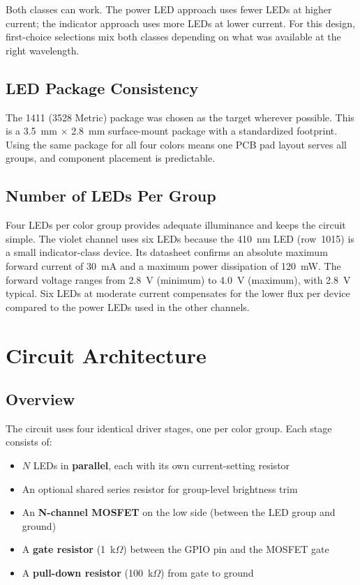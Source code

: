 \documentclass[12pt,letterpaper]{article}
\begin{document}
Both classes can work. The power LED approach uses fewer LEDs at higher current;
the indicator approach uses more LEDs at lower current. For this design, first-choice
selections mix both classes depending on what was available at the right wavelength.

\subsection{LED Package Consistency}

The 1411 (3528 Metric) package was chosen as the target wherever possible. This is a
3.5~mm $\times$ 2.8~mm surface-mount package with a standardized footprint. Using the
same package for all four colors means one PCB pad layout serves all groups, and
component placement is predictable.

\subsection{Number of LEDs Per Group}

Four LEDs per color group provides adequate illuminance and keeps the circuit simple.
The violet channel uses six LEDs because the 410~nm LED (row~1015) is a small
indicator-class device. Its datasheet confirms an absolute maximum forward current of
30~mA and a maximum power dissipation of 120~mW. The forward voltage ranges from
2.8~V (minimum) to 4.0~V (maximum), with 2.8~V typical. Six LEDs at moderate current
compensates for the lower flux per device compared to the power LEDs used in the other
channels.

\section{Circuit Architecture}

\subsection{Overview}

The circuit uses four identical driver stages, one per color group. Each stage consists of:

\begin{itemize}[leftmargin=2em]
  \item $N$ LEDs in \textbf{parallel}, each with its own current-setting resistor
  \item An optional shared series resistor for group-level brightness trim
  \item An \textbf{N-channel MOSFET} on the low side (between the LED group and ground)
  \item A \textbf{gate resistor} (1~k$\Omega$) between the GPIO pin and the MOSFET gate
  \item A \textbf{pull-down resistor} (100~k$\Omega$) from gate to ground
\end{itemize}
\end{document}
